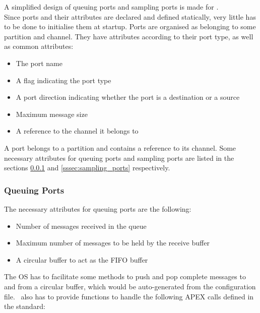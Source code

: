 A simplified design of queuing ports and sampling ports is made for \OSname.\\

Since ports and their attributes are declared and defined statically,
very little has to be done to initialise them at startup.
Ports are organised as belonging to some partition and channel.
They have attributes according to their port type, as well as common attributes:

\begin{itemize}
	\item The port name
	\item A flag indicating the port type
	\item A port direction indicating whether the port is a destination or a source
	\item Maximum message size
	\item A reference to the channel it belongs to
\end{itemize}



A port belongs to a partition and contains a reference to its channel.
Some necessary attributes for queuing ports and sampling ports are listed in
the sections \ref{sssec:queuing_ports} and \ref{sssec:sampling_ports} respectively.


\subsubsection{Queuing Ports}
\label{sssec:queuing_ports}
The necessary attributes for queuing ports are the following:
\begin{itemize}
	\item Number of messages received in the queue
	\item Maximum number of messages to be held by the receive buffer
	\item A circular buffer to act as the FIFO buffer
\end{itemize}

The OS has to facilitate some methods to push and pop complete messages to and from a circular buffer,
which would be auto-generated from the configuration file.
\OSname\ also has to provide functions to handle the following APEX calls defined in the standard\cite{arinc_interpartition_comm}:

